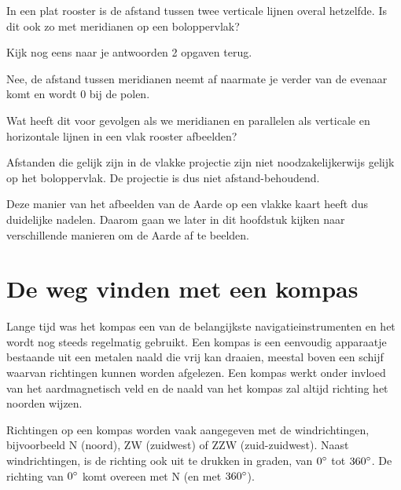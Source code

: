 \begin{opgave}[\vinger]
	\begin{subopgave}
		In een plat rooster is de afstand tussen twee verticale lijnen overal hetzelfde. Is dit ook zo met meridianen op een boloppervlak?
		\begin{hint}
			Kijk nog eens naar je antwoorden 2 opgaven terug.
		\end{hint}
		\begin{antwoord}
			Nee, de afstand tussen meridianen neemt af naarmate je verder van de evenaar komt en wordt 0 bij de polen.
		\end{antwoord}
	\end{subopgave}
	\begin{subopgave}
		 Wat heeft dit voor gevolgen als we meridianen en parallelen als verticale en horizontale lijnen in een vlak rooster afbeelden?
		\begin{antwoord}
			Afstanden die gelijk zijn in de vlakke projectie zijn niet noodzakelijkerwijs gelijk op het boloppervlak. De projectie is dus niet afstand-behoudend.
		\end{antwoord}
	\end{subopgave}
\end{opgave}

Deze manier van het afbeelden van de Aarde op een vlakke kaart heeft dus duidelijke nadelen. Daarom gaan we later in dit hoofdstuk kijken naar verschillende manieren om de Aarde af te beelden. 

\section{De weg vinden met een kompas}
Lange tijd was het kompas een van de belangijkste navigatieinstrumenten en het wordt nog steeds regelmatig gebruikt. Een kompas is een eenvoudig apparaatje bestaande uit een metalen naald die vrij kan draaien, meestal boven een schijf waarvan richtingen kunnen worden afgelezen. Een kompas werkt onder invloed van het aardmagnetisch veld en de naald van het kompas zal altijd richting het noorden wijzen.

Richtingen op een kompas worden vaak aangegeven met de windrichtingen, bijvoorbeeld N (noord), ZW (zuidwest) of ZZW (zuid-zuidwest). Naast windrichtingen, is de richting ook uit te drukken in graden, van $0\degree$ tot $360\degree$. De richting van $0\degree$ komt overeen met N (en met $360\degree$).

